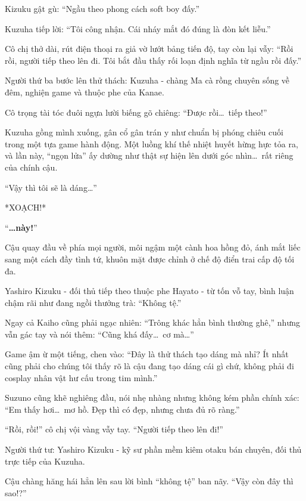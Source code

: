 \documentclass[../main.tex]{subfiles}
\begin{document}
Kizuku gật gù: ``Ngầu theo phong cách soft boy đấy.''

Kuzuha tiếp lời: ``Tôi công nhận. Cái nháy mắt đó đúng là đòn kết liễu.''

Cô chị thở dài, rút điện thoại ra giả vờ lướt bảng tiến độ, tay còn lại vẫy: ``Rồi rồi, người tiếp theo lên đi. Tôi bắt đầu thấy rối loạn định nghĩa từ ngầu rồi đấy.''

\ct

Người thứ ba bước lên thử thách: Kuzuha - chàng Ma cà rồng chuyên sống về đêm, nghiện game và thuộc phe của Kanae.

Cô trọng tài tóc đuôi ngựa lười biếng gõ chiêng: ``Được rồi\dots\ tiếp theo!''

Kuzuha gồng mình xuống, gân cổ gân trán y như chuẩn bị phóng chiêu cuối trong một tựa game hành động. Một luồng khí thế nhiệt huyết hừng hực tỏa ra, và lần này, ``ngọn lửa'' ấy dường như thật sự hiện lên dưới góc nhìn\dots\ rất riêng của chính cậu.

``Vậy thì tôi sẽ là dáng\dots''

*XOẠCH!*

``\textbf{\dots này!}''


Cậu quay đầu về phía mọi người, môi ngậm một cành hoa hồng đỏ, ánh mắt liếc sang một cách đầy tình tứ, khuôn mặt được chỉnh ở chế độ điển trai cấp độ tối đa.

Yashiro Kizuku - đối thủ tiếp theo thuộc phe Hayato - từ tốn vỗ tay, bình luận chậm rãi như đang ngồi thưởng trà: ``Không tệ.''

Ngay cả Kaiho cũng phải ngạc nhiên: ``Trông khác hẳn bình thường ghê,'' nhưng vẫn gác tay và nói thêm: ``Cũng khá đấy\dots\ cơ mà\dots''

Game ậm ừ một tiếng, chen vào: ``Đây là thử thách tạo dáng mà nhỉ? Ít nhất cũng phải cho chúng tôi thấy rõ là cậu đang tạo dáng cái gì chứ, không phải đi cosplay nhân vật hư cấu trong tim mình.''

Suzuno cũng khẽ nghiêng đầu, nói nhẹ nhàng nhưng không kém phần chính xác: ``Em thấy hơi\dots\ mơ hồ. Đẹp thì có đẹp, nhưng chưa đủ rõ ràng.''

``Rồi, rồi!'' cô chị vội vàng vẫy tay. ``Người tiếp theo lên đi!''

\ct

Người thứ tư: Yashiro Kizuku - kỹ sư phần mềm kiêm otaku bán chuyên, đối thủ trực tiếp của Kuzuha.

Cậu chàng hăng hái hẳn lên sau lời bình ``không tệ'' ban nãy. ``Vậy còn đây thì sao!?''
\end{document}
